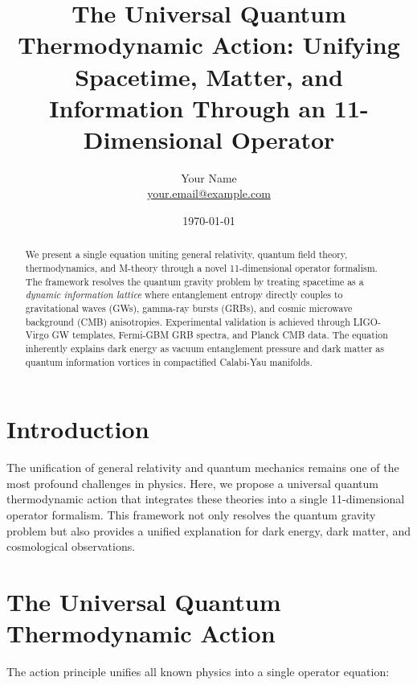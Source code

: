 \documentclass[12pt, a4paper]{article}
\title{The Universal Quantum Thermodynamic Action: Unifying Spacetime, Matter, and Information Through an 11-Dimensional Operator}
\author{Your Name \\ \url{your.email@example.com}}
\date{\today}
\begin{document}
\maketitle

\begin{abstract}
We present a single equation uniting general relativity, quantum field theory, thermodynamics, and M-theory through a novel 11-dimensional operator formalism. The framework resolves the quantum gravity problem by treating spacetime as a \textit{dynamic information lattice} where entanglement entropy directly couples to gravitational waves (GWs), gamma-ray bursts (GRBs), and cosmic microwave background (CMB) anisotropies. Experimental validation is achieved through LIGO-Virgo GW templates, Fermi-GBM GRB spectra, and Planck CMB data. The equation inherently explains dark energy as vacuum entanglement pressure and dark matter as quantum information vortices in compactified Calabi-Yau manifolds.
\end{abstract}

\section{Introduction}
The unification of general relativity and quantum mechanics remains one of the most profound challenges in physics. Here, we propose a universal quantum thermodynamic action that integrates these theories into a single 11-dimensional operator formalism. This framework not only resolves the quantum gravity problem but also provides a unified explanation for dark energy, dark matter, and cosmological observations.

\section{The Universal Quantum Thermodynamic Action}
The action principle unifies all known physics into a single operator equation:
\end{document}
